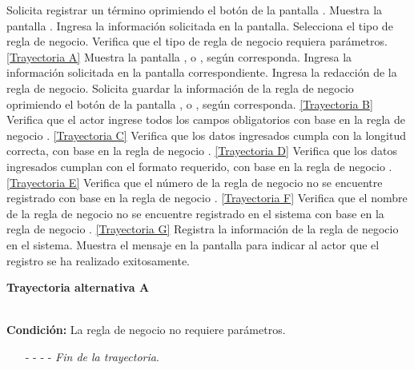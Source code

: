 	\begin{UCtrayectoria}
		\UCpaso[\UCactor] Solicita registrar un término oprimiendo el botón  de la pantalla .
		\UCpaso[\UCsist] Muestra la pantalla .
		\UCpaso[\UCactor] Ingresa la información solicitada en la pantalla. \label{CU8.1-P3}
		\UCpaso[\UCactor] Selecciona el tipo de regla de negocio.
		\UCpaso[\UCsist] Verifica que el tipo de regla de negocio requiera parámetros. \hyperlink{CU8-1:TAA}{[Trayectoria A]}
		\UCpaso[\UCsist] Muestra la pantalla ,  o , según corresponda.
		\UCpaso[\UCsist] Ingresa la información solicitada en la pantalla correspondiente.
		\UCpaso[\UCsist] Ingresa la redacción de la regla de negocio. \label{CU8.1-P9}
		\UCpaso[\UCactor] Solicita guardar la información de la regla de negocio oprimiendo el botón  de la pantalla ,  o , según corresponda. \hyperlink{CU8-1:TAB}{[Trayectoria B]}
		\UCpaso[\UCsist] Verifica que el actor ingrese todos los campos obligatorios con base en la regla de negocio . \hyperlink{CU8-1:TAC}{[Trayectoria C]}
		\UCpaso[\UCsist] Verifica que los datos ingresados cumpla con la longitud correcta, con base en la regla de negocio . \hyperlink{CU8-1:TAD}{[Trayectoria D]}
		\UCpaso[\UCsist] Verifica que los datos ingresados cumplan con el formato requerido, con base en la regla de negocio . \hyperlink{CU8-1:TAE}{[Trayectoria E]}
		\UCpaso[\UCsist] Verifica que el número de la regla de negocio no se encuentre registrado con base en la regla de negocio . \hyperlink{CU8-1:TAF}{[Trayectoria F]}
		\UCpaso[\UCsist] Verifica que el nombre de la regla de negocio no se encuentre registrado en el sistema con base en la regla de negocio . \hyperlink{CU8-1:TAG}{[Trayectoria G]}
		\UCpaso[\UCsist] Registra la información de la regla de negocio en el sistema.
		\UCpaso[\UCsist] Muestra el mensaje  en la pantalla  para indicar al actor que el registro se ha realizado exitosamente.
	\end{UCtrayectoria}		
\hypertarget{CU8-1:TAA}{\textbf{Trayectoria alternativa A}}\\
\noindent \textbf{Condición:} La regla de negocio no requiere parámetros.
\begin{enumerate}
	\UCpaso[\UCactor] Continúa con el paso \ref{CU8.1-P9} de la trayectoria principal.
	\item[- -] - - {\em {Fin de la trayectoria}}.%
\end{enumerate}
	
